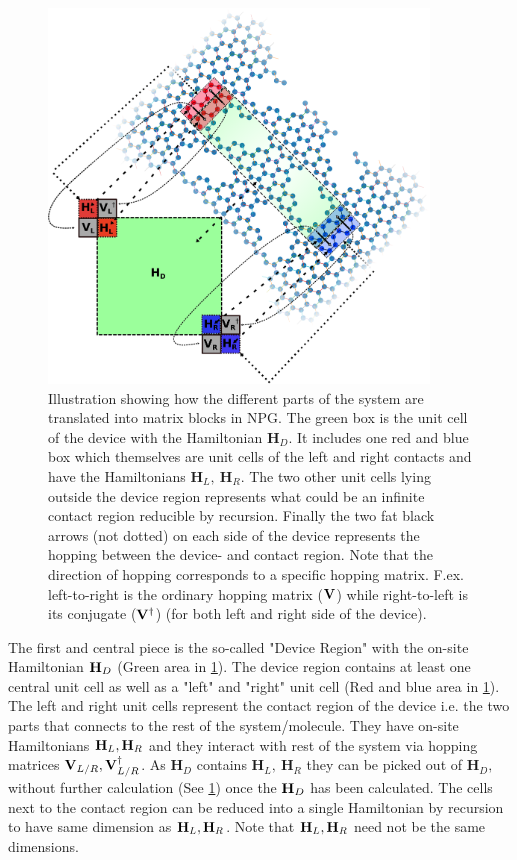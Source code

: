 \begin{figure}
    \centering 
    \includegraphics[width=0.9\textwidth]{Figures/illu.eps}
    \caption{Illustration showing how the different parts of the system are translated into matrix blocks in NPG. The green box is the unit cell of the device with the Hamiltonian \(\textbf{H}_D\). It includes one red and blue box which themselves are unit cells of the left and right contacts and have the Hamiltonians \(\textbf{H}_L,\ \textbf{H}_R\). The two other unit cells lying outside the device region represents what could be an infinite contact region reducible by recursion. Finally the two fat black arrows (not dotted) on each side of the device represents the hopping between the device- and contact region. Note that the direction of hopping corresponds to a specific hopping matrix. F.ex. left-to-right is the ordinary hopping matrix (\(\vb{V}\)) while right-to-left is its conjugate (\(\vb{V}^{\dagger}\)) (for both left and right side of the device).}
    \label{systemillu}
\end{figure}
The first and central piece is the so-called "Device Region" with the on-site Hamiltonian \(\vb{H}_D\) (Green area in \cref{systemillu}). The device region contains at least one central unit cell as well as a "left" and "right" unit cell (Red and blue area in \cref{systemillu}). The left and right unit cells represent the contact region of the device i.e. the two parts that connects to the rest of the system/molecule. They have on-site Hamiltonians \(\vb{H}_L,\vb{H}_R\) and they interact with rest of the system via hopping matrices \(\vb{V}_{L/R},\vb{V}^{\dagger}_{L/R}\). As \(\textbf{H}_D\) contains \(\textbf{H}_L,\ \textbf{H}_R\) they can be picked out of \(\textbf{H}_D, \)  without further calculation (See \cref{systemillu}) once the \(\vb{H}_D\) has been calculated. The cells next to the contact region can be reduced into a single Hamiltonian by recursion to have same dimension as \(\vb{H}_L,\vb{H}_R\). Note that \(\vb{H}_L,\vb{H}_R\) need not be the same dimensions.
